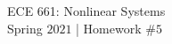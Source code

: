 \begin{center}

{\Large ECE 661: Nonlinear Systems \\[0ex]
Spring $2021$ | Homework $\#5$}
\end{center}






\bracketedpoints


